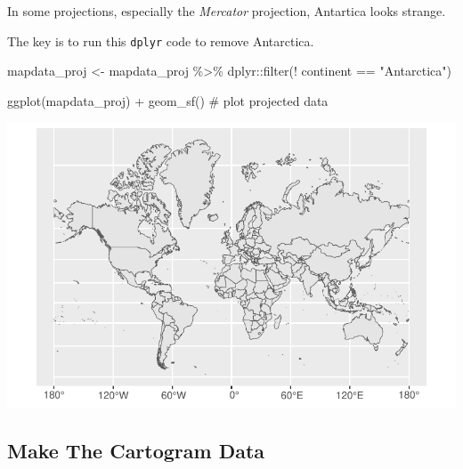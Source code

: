 \documentclass[
  letterpaper,
  DIV=11,
  numbers=noendperiod,
  oneside]{scrreprt}
\newenvironment{Shaded}{\begin{snugshade}}{\end{snugshade}}
\newcommand{\CommentTok}[1]{\textcolor[rgb]{0.37,0.37,0.37}{#1}}
\newcommand{\FunctionTok}[1]{\textcolor[rgb]{0.28,0.35,0.67}{#1}}
\newcommand{\NormalTok}[1]{\textcolor[rgb]{0.00,0.23,0.31}{#1}}
\newcommand{\OtherTok}[1]{\textcolor[rgb]{0.00,0.23,0.31}{#1}}
\newcommand{\SpecialCharTok}[1]{\textcolor[rgb]{0.37,0.37,0.37}{#1}}
\newcommand{\StringTok}[1]{\textcolor[rgb]{0.13,0.47,0.30}{#1}}
\begin{document}
\begin{tcolorbox}[enhanced jigsaw, coltitle=black, breakable, leftrule=.75mm, opacityback=0, colback=white, bottomtitle=1mm, left=2mm, toptitle=1mm, toprule=.15mm, opacitybacktitle=0.6, rightrule=.15mm, titlerule=0mm, colframe=quarto-callout-tip-color-frame, bottomrule=.15mm, title=\textcolor{quarto-callout-tip-color}{\faLightbulb}\hspace{0.5em}{Why Does Antarctica Look So Strange? How To Fix This?}, colbacktitle=quarto-callout-tip-color!10!white, arc=.35mm]

In some projections, especially the \emph{Mercator} projection,
Antartica looks strange.

The key is to run this \texttt{dplyr} code to remove Antarctica.

\begin{Shaded}
\begin{Highlighting}[]
\NormalTok{mapdata\_proj }\OtherTok{\textless{}{-}}\NormalTok{ mapdata\_proj }\SpecialCharTok{\%\textgreater{}\%} 
\NormalTok{  dplyr}\SpecialCharTok{::}\FunctionTok{filter}\NormalTok{(}\SpecialCharTok{!}\NormalTok{ continent }\SpecialCharTok{==} \StringTok{"Antarctica"}\NormalTok{)}

\FunctionTok{ggplot}\NormalTok{(mapdata\_proj) }\SpecialCharTok{+} 
  \FunctionTok{geom\_sf}\NormalTok{() }\CommentTok{\# plot projected data}
\end{Highlighting}
\end{Shaded}

\includegraphics{cartogram_files/figure-pdf/unnamed-chunk-7-1.pdf}

\end{tcolorbox}

\subsection{Make The Cartogram Data}\label{make-the-cartogram-data}
\end{document}

